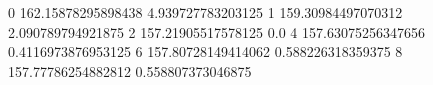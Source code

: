 0 162.15878295898438 4.939727783203125
1 159.30984497070312 2.090789794921875
2 157.21905517578125 0.0
4 157.63075256347656 0.4116973876953125
6 157.80728149414062 0.588226318359375
8 157.77786254882812 0.558807373046875
